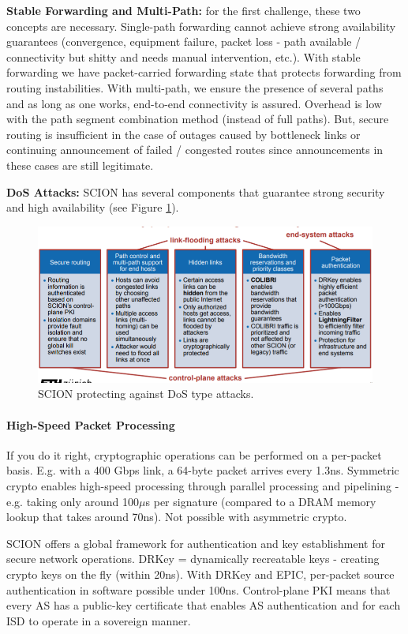 \textbf{Stable Forwarding and Multi-Path:} for the first challenge, these two concepts are necessary. Single-path forwarding cannot achieve strong availability guarantees (convergence, equipment failure, packet loss - path available / connectivity but shitty and needs manual intervention, etc.). With stable forwarding we have packet-carried forwarding state that protects forwarding from routing instabilities. With multi-path, we ensure the presence of several paths and as long as one works, end-to-end connectivity is assured. Overhead is low with the path segment combination method (instead of full paths). But, secure routing is insufficient in the case of outages caused by bottleneck links or continuing announcement of failed / congested routes since announcements in these cases are still legitimate.

\textbf{DoS Attacks:} SCION has several components that guarantee strong security and high availability (see Figure \ref{fig:secure}).

\begin{figure}[h]
	\centering
	\includegraphics[scale=0.8]{images/910-secure.PNG}
	\caption{SCION protecting against DoS type attacks.}
	\label{fig:secure}
\end{figure}

\paragraph{High-Speed Packet Processing}
If you do it right, cryptographic operations can be performed on a per-packet basis. E.g. with a 400 Gbps link, a 64-byte packet arrives every 1.3ns. Symmetric crypto enables high-speed processing through parallel processing and pipelining - e.g. taking only around 100$\mu$s per signature (compared to a DRAM memory lookup that takes around 70ns). Not possible with asymmetric crypto. %

SCION offers a global framework for authentication and key establishment for secure network operations. DRKey = dynamically recreatable keys - creating crypto keys on the fly (within 20ns). With DRKey and EPIC, per-packet source authentication in software possible under 100ns. Control-plane PKI means that every AS has a public-key certificate that enables AS authentication and for each ISD to operate in a sovereign manner.

